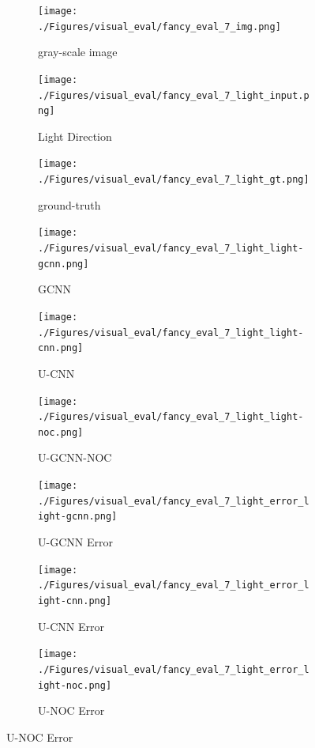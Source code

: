 \documentclass[border=15pt, multi, tikz]{article}
\begin{document}
\begin{figure}[H]
	\centering
	\begin{subfigure}[b]{0.24\linewidth}
		\texttt{[image: ./Figures/visual\_eval/fancy\_eval\_7\_img.png]}
		\caption{gray-scale image}
	\end{subfigure}
	\begin{subfigure}[b]{0.24\linewidth}
		\texttt{[image: ./Figures/visual\_eval/fancy\_eval\_7\_light\_input.png]}
		\caption{Light Direction}
	\end{subfigure}
	\begin{subfigure}[b]{0.24\linewidth}
		\texttt{[image: ./Figures/visual\_eval/fancy\_eval\_7\_light\_gt.png]}
		\caption{ground-truth}
	\end{subfigure}
	
	\begin{subfigure}[b]{0.24\linewidth}
		\texttt{[image: ./Figures/visual\_eval/fancy\_eval\_7\_light\_light-gcnn.png]}
		\caption{GCNN}
	\end{subfigure}
	\begin{subfigure}[b]{0.24\linewidth}
		\texttt{[image: ./Figures/visual\_eval/fancy\_eval\_7\_light\_light-cnn.png]}
		\caption{U-CNN}
	\end{subfigure}
	\begin{subfigure}[b]{0.24\linewidth}
		\texttt{[image: ./Figures/visual\_eval/fancy\_eval\_7\_light\_light-noc.png]}
		\caption{U-GCNN-NOC}
	\end{subfigure}
	
	\begin{subfigure}[b]{0.24\linewidth}
		\texttt{[image: ./Figures/visual\_eval/fancy\_eval\_7\_light\_error\_light-gcnn.png]}
		\caption{U-GCNN Error}
	\end{subfigure}
	\begin{subfigure}[b]{0.24\linewidth}
		\texttt{[image: ./Figures/visual\_eval/fancy\_eval\_7\_light\_error\_light-cnn.png]}
		\caption{U-CNN Error}
	\end{subfigure}
	\begin{subfigure}[b]{0.24\linewidth}
		\texttt{[image: ./Figures/visual\_eval/fancy\_eval\_7\_light\_error\_light-noc.png]}
		\caption{U-NOC Error}
	\end{subfigure}
	

\end{figure}
\end{document}
